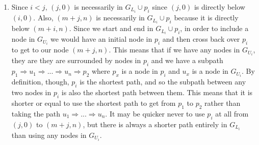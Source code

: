 \documentclass[12pt]{article}
\begin{document}
\begin{enumerate}[label=(\alph*)]
    \item Since $i < j$, $(j,0)$ is necessarily in $G_{L_i} \cup p_i$ since $(j,0)$ is directly below $(i,0)$. Also, $(m+j,n)$ is necessarily in $G_{L_i} \cup p_i$ because it is directly below $(m+i,n)$. Since we start and end in $G_{L_i} \cup p_i$, in order to include a node in $G_{U_i}$ we would have an initial node in $p_i$ and then cross back over $p_i$ to get to our node $(m+j,n)$. This means that if we have any nodes in $G_{U_i}$, they are they are surrounded by nodes in $p_i$ and we have a subpath $p_1 \Rightarrow u_1 \Rightarrow ... \Rightarrow u_n \Rightarrow p_2$ where $p_x$ is a node in $p_i$ and $u_x$ is a node in $ G_{U_i}$. By definition, though, $p_i$ is the shortest path, and so the subpath between any two nodes in $p_i$ is also the shortest path between them. This means that it is shorter or equal to use the shortest path to get from $p_1$ to $p_2$ rather than taking the path $u_1 \Rightarrow ... \Rightarrow u_n$. It may be quicker never to use $p_i$ at all from $(j,0)$ to $(m+j,n)$, but there is always a shorter path entirely in $G_{L_i}$ than using any nodes in $G_{U_i}$.
\end{enumerate}
\end{document}
